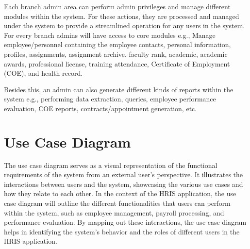 Each branch admin area can perform admin privileges and manage different modules within the system. For these actions, they are processed and managed under the system to provide a streamlined operation for any users in the system. For every branch admins will have access to core modules e.g., Manage employee/personnel containing the employee contacts, personal information, profiles, assignments, assignment archive, faculty rank, academic, academic awards, professional license, training attendance, Certificate of Employment (COE), and health record.

Besides this, an admin can also generate different kinds of reports within the system e.g., performing data extraction, queries, employee performance evaluation, COE reports, contracts/appointment generation, etc.

\section{Use Case Diagram}

The use case diagram serves as a visual representation of the functional requirements of the system from an external user's perspective. It illustrates the interactions between users and the system, showcasing the various use cases and how they relate to each other. In the context of the HRIS application, the use case diagram will outline the different functionalities that users can perform within the system, such as employee management, payroll processing, and performance evaluation. By mapping out these interactions, the use case diagram helps in identifying the system's behavior and the roles of different users in the HRIS application.

